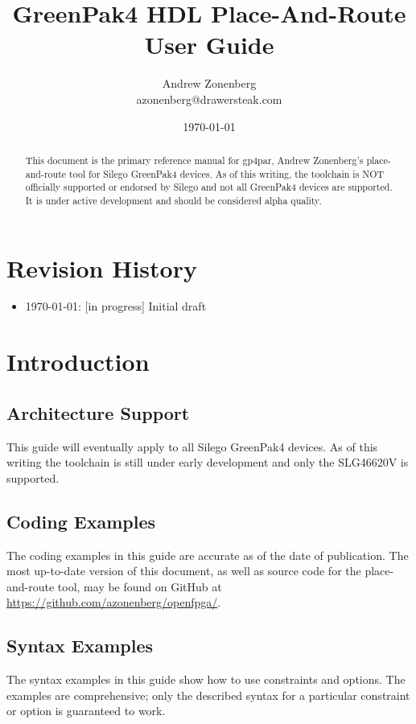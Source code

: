 \documentclass{article}
\begin{document}
\title{GreenPak4 HDL Place-And-Route User Guide}
\author{Andrew Zonenberg\\
azonenberg@drawersteak.com}
\date{\today}
\maketitle

\begin{abstract}
This document is the primary reference manual for gp4par, Andrew Zonenberg's place-and-route tool for Silego 
GreenPak4 devices. As of this writing, the toolchain is NOT officially supported or endorsed by Silego and not all 
GreenPak4 devices are supported. It is under active development and should be considered alpha quality.
\end{abstract}

\pagebreak

\tableofcontents

\pagebreak
\section{Revision History}
\begin{itemize}
\item \today: [in progress] Initial draft
\end{itemize}

\pagebreak
\section{Introduction}

\subsection{Architecture Support}
This guide will eventually apply to all Silego GreenPak4 devices. As of this writing the toolchain is still under early
development and only the SLG46620V is supported.

\subsection{Coding Examples}
The coding examples in this guide are accurate as of the date of publication. The most up-to-date version of this 
document, as well as source code for the place-and-route tool, may be found on GitHub at 
\url{https://github.com/azonenberg/openfpga/}.

\subsection{Syntax Examples}
The syntax examples in this guide show how to use constraints and options. The examples are comprehensive; only the 
described syntax for a particular constraint or option is guaranteed to work.
\end{document}
